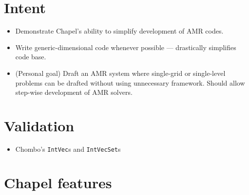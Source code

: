 \documentclass[11pt]{article}
\begin{document}
\section*{Intent}
\begin{itemize}
\item Demonstrate Chapel's ability to simplify development of AMR codes.
\item Write generic-dimensional code whenever possible --- drastically simplifies code base.
\item (Personal goal) Draft an AMR system where single-grid or single-level problems can be drafted without using unnecessary framework.  Should allow step-wise development of AMR solvers.
\end{itemize}

\section*{Validation}
\begin{itemize}
\item Chombo's \texttt{IntVec}s and \texttt{IntVecSet}s
\end{itemize}

\section*{Chapel features}
\end{document}
